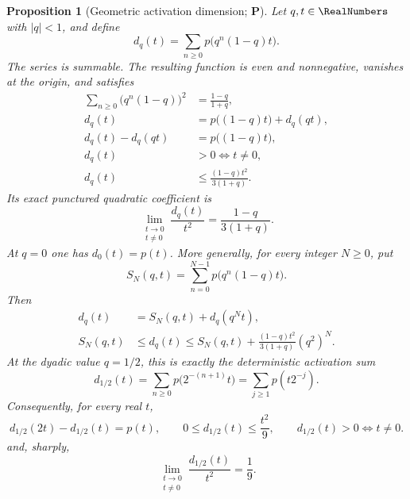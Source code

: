 \documentclass[11pt,oneside]{article}
\newtheorem{proposition}[theorem]{Proposition}
\theoremstyle{definition}
\theoremstyle{remark}
\newcommand{\statusP}{\textcolor{deepgreen}{\textbf{P}}}
\begin{document}
\begin{proposition}[Geometric activation dimension; \statusP]
\label{prop:geometric-activation-dimension}
Let $q,t\in\RealNumbers$ with $|q|<1$, and define
\begin{equation}
 d_q(t)=\sum_{n\ge0}p\bigl(q^n(1-q)t\bigr).
 \label{eq:geometric-activation-dimension}
\end{equation}
The series is summable.  The resulting function is even and nonnegative,
vanishes at the origin, and satisfies
\begin{align}
 \sum_{n\ge0}\bigl(q^n(1-q)\bigr)^2
 &=\frac{1-q}{1+q},
 \label{eq:normalized-geometric-weight-square-sum}\\
 d_q(t)
 &=p\bigl((1-q)t\bigr)+d_q(qt),
 \label{eq:geometric-activation-refinement}\\
 d_q(t)-d_q(qt)
 &=p\bigl((1-q)t\bigr),
 \label{eq:geometric-activation-difference}\\
 d_q(t)&>0\iff t\ne0,
 \label{eq:geometric-activation-positive}\\
 d_q(t)
 &\le \frac{(1-q)t^2}{3(1+q)}.
 \label{eq:geometric-activation-quadratic}
\end{align}
Its exact punctured quadratic coefficient is
\begin{equation}
 \boxed{
 \lim_{\substack{t\to0\\t\ne0}}\frac{d_q(t)}{t^2}
 =\frac{1-q}{3(1+q)}.}
 \label{eq:geometric-activation-sharp}
\end{equation}
At $q=0$ one has $d_0(t)=p(t)$.  More generally, for every integer $N\ge0$,
put
\[
 S_N(q,t)=\sum_{n=0}^{N-1}p\bigl(q^n(1-q)t\bigr).
\]
Then
\begin{align}
 d_q(t)&=S_N(q,t)+d_q(q^Nt),
 \label{eq:geometric-activation-prefix}\\
 S_N(q,t)&\le d_q(t)
 \le S_N(q,t)+
 \frac{(1-q)t^2}{3(1+q)}(q^2)^N.
 \label{eq:geometric-activation-enclosure}
\end{align}
At the dyadic value $q=1/2$, this is exactly the deterministic activation sum
\[
 d_{1/2}(t)=\sum_{n\ge0}p\bigl(2^{-(n+1)}t\bigr)
            =\sum_{j\ge1}p(t2^{-j}).
\]
Consequently, for every real $t$,
\begin{equation}
 d_{1/2}(2t)-d_{1/2}(t)=p(t),
 \qquad
 0\le d_{1/2}(t)\le\frac{t^2}{9},
 \qquad
 d_{1/2}(t)>0\iff t\ne0.
 \label{eq:formalized-dyadic-effective-dimension}
\end{equation}
and, sharply,
\begin{equation}
 \boxed{
 \lim_{\substack{t\to0\\t\ne0}}\frac{d_{1/2}(t)}{t^2}=\frac19.}
 \label{eq:dyadic-effective-dimension-sharp}
\end{equation}
\end{proposition}
\end{document}
